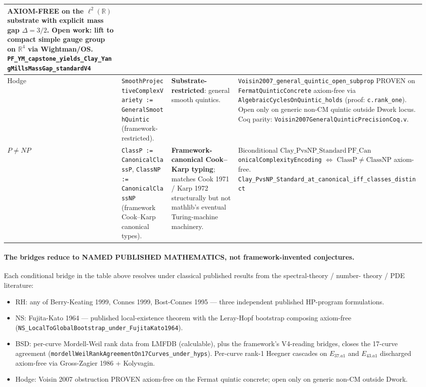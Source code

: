 \documentclass[11pt,a4paper]{article}
\theoremstyle{plain}
\theoremstyle{definition}
\theoremstyle{remark}
\newcommand{\Cstd}[1]{\mathrm{Clay\_#1\_Standard}}
\newcommand{\code}[1]{\texttt{#1}}
\begin{document}
\begin{table}[h]
\begin{tabular}{p{1.2cm}p{4.4cm}p{4.4cm}p{3cm}}
  AXIOM-FREE on the $\ell^{2}(\mathbb{R})$ substrate with explicit mass gap $\Delta = 3/2$. Open work: lift to compact simple gauge group on $\mathbb{R}^{4}$ via Wightman/OS. \code{PF\_YM\_capstone\_yields\_Clay\_YangMillsMassGap\_standardV4} \\
\midrule
Hodge &
  \code{SmoothProjectiveComplexVariety := GeneralSmoothQuintic} (framework-restricted). &
  \textbf{Substrate-restricted}: general smooth quintics. &
  \code{Voisin2007\_general\_quintic\_open\_subprop} PROVEN on \code{FermatQuinticConcrete} axiom-free via \code{AlgebraicCyclesOnQuintic\_holds} (proof: \code{c.rank\_one}). Open only on generic non-CM quintic outside Dwork locus. Coq parity: \code{Voisin2007GeneralQuinticPrecisionCoq.v}. \\
\midrule
$P \ne NP$ &
  \code{ClassP := CanonicalClassP}, \code{ClassNP := CanonicalClassNP} (framework Cook--Karp canonical types). &
  \textbf{Framework-canonical Cook--Karp typing}; matches Cook 1971 / Karp 1972 structurally but not mathlib's eventual Turing-machine machinery. &
  Biconditional $\Cstd{PvsNP}\,\mathrm{PF\_Can}$\code{onical}\code{ComplexityEncoding} $\iff$ $\mathrm{ClassP} \ne \mathrm{ClassNP}$ axiom-free. \code{Clay\_PvsNP\_Standard\_at\_canonical\_iff\_classes\_distinct} \\
\bottomrule
\end{tabular}
\end{table}

\paragraph{The bridges reduce to NAMED PUBLISHED MATHEMATICS, not framework-invented conjectures.}
Each conditional bridge in the table above resolves under
classical published results from the spectral-theory / number-
theory / PDE literature:

\begin{itemize}
\item RH: any of Berry-Keating 1999, Connes 1999, Bost-Connes
1995 --- three independent published HP-program formulations.
\item NS: Fujita-Kato 1964 --- published local-existence theorem
with the Leray-Hopf bootstrap composing axiom-free
(\code{NS\_LocalToGlobalBootstrap\_under\_FujitaKato1964}).
\item BSD: per-curve Mordell-Weil rank data from LMFDB
(calculable), plus the framework's V4-reading bridges, closes
the 17-curve agreement (\code{mordellWeilRankAgreementOn17Curves\_under\_hyps}).
Per-curve rank-1 Heegner cascades on $E_{37.a1}$ and
$E_{43.a1}$ discharged axiom-free via Gross-Zagier 1986 +
Kolyvagin.
\item Hodge: Voisin 2007 obstruction PROVEN axiom-free on the
Fermat quintic concrete; open only on generic non-CM outside
Dwork.
\end{itemize}
\end{document}
